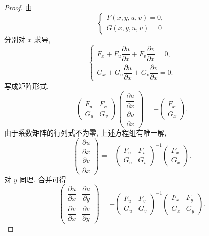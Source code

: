 \begin{proof}
	由
	\[
	\begin{cases}
	F(x,y,u,v)=0,\\
	G(x,y,u,v)=0
	\end{cases}
	\]
	分别对 $x$ 求导,
	\[
	\begin{cases}
	F_x+F_u\dfrac{\partial u}{\partial x}
	+F_v\dfrac{\partial v}{\partial x}=0,\\[6pt]
	G_x+G_u\dfrac{\partial u}{\partial x}
	+G_v\dfrac{\partial v}{\partial x}=0.
	\end{cases}
	\]
	写成矩阵形式,
	\[
	\begin{pmatrix}
	F_u&F_v\\
	G_u&G_v
	\end{pmatrix}
	\begin{pmatrix}
	\dfrac{\partial u}{\partial x}\\[5pt]
	\dfrac{\partial v}{\partial x}
	\end{pmatrix}
	=
	-
	\begin{pmatrix}
	F_x\\
	G_x
	\end{pmatrix}.
	\]
	由于系数矩阵的行列式不为零, 上述方程组有唯一解,
	\[
	\begin{pmatrix}
	\dfrac{\partial u}{\partial x}\\[5pt]
	\dfrac{\partial v}{\partial x}
	\end{pmatrix}
	=
	-
	\begin{pmatrix}
	F_u&F_v\\
	G_u&G_v
	\end{pmatrix}^{-1}
	\begin{pmatrix}
	F_x\\
	G_x
	\end{pmatrix}.
	\]
	对 $y$ 同理. 合并可得
	\[
	\begin{pmatrix}
	\dfrac{\partial u}{\partial x}&
	\dfrac{\partial u}{\partial y}\\[6pt]
	\dfrac{\partial v}{\partial x}&
	\dfrac{\partial v}{\partial y}
	\end{pmatrix}
	=
	-
	\begin{pmatrix}
	F_u&F_v\\
	G_u&G_v
	\end{pmatrix}^{-1}
	\begin{pmatrix}
	F_x&F_y\\
	G_x&G_y
	\end{pmatrix}.
	\]
\end{proof}

